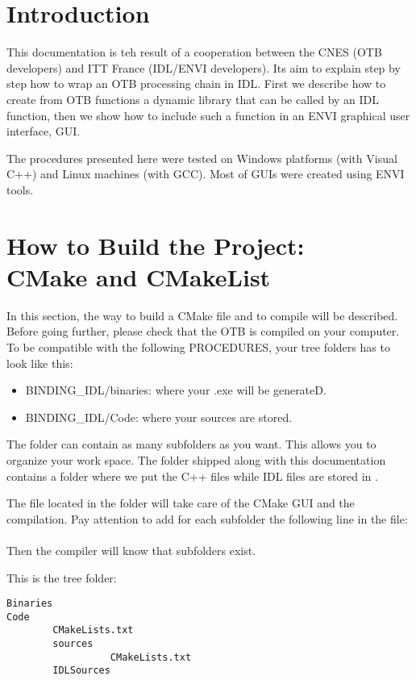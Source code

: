 
\section{Introduction}
  This documentation is teh result of a cooperation between the CNES (OTB developers) and ITT France (IDL/ENVI developers). Its aim to explain step by step how to wrap an OTB processing chain in IDL. First we describe how to create from OTB functions a dynamic library that can be called by an IDL function, then we show how to include such a function in an ENVI graphical user interface, GUI.

The procedures presented here were tested on Windows platforms (with Visual C++) and Linux machines (with GCC). Most of GUIs were created using ENVI tools.

\section{How to Build the Project:\\ CMake and CMakeList}
In this section, the way to build a CMake file and to compile will be described.
Before going further, please check that the OTB is compiled on your computer.
To be compatible with the following PROCEDURES, your tree folders has to look like this:
\begin{itemize}
\item BINDING\_IDL/binaries: where your .exe will be generateD.
\item BINDING\_IDL/Code: where your sources are stored.
\end{itemize}

The  folder can contain as many subfolders as you want. This allows you to organize your work space. The  folder shipped along with this 
documentation contains a  folder where we put the C++ files while IDL files are stored in .

The  file located in the  folder will take care of the CMake GUI and the compilation. Pay attention to add for each subfolder
the following line in the  file:\\
\\

Then the compiler will know that subfolders exist.
 
This is the tree folder:
\begin{verbatim}
Binaries
Code
        CMakeLists.txt
        sources
                  CMakeLists.txt
        IDLSources
\end{verbatim}
 
